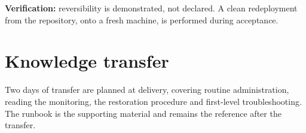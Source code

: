 \begin{encadre}
\textbf{Verification:} reversibility is demonstrated, not declared. A clean
redeployment from the repository, onto a fresh machine, is performed during
acceptance.
\end{encadre}

\section{Knowledge transfer}
Two days of transfer are planned at delivery, covering routine administration,
reading the monitoring, the restoration procedure and first-level
troubleshooting. The runbook is the supporting material and remains the
reference after the transfer.
